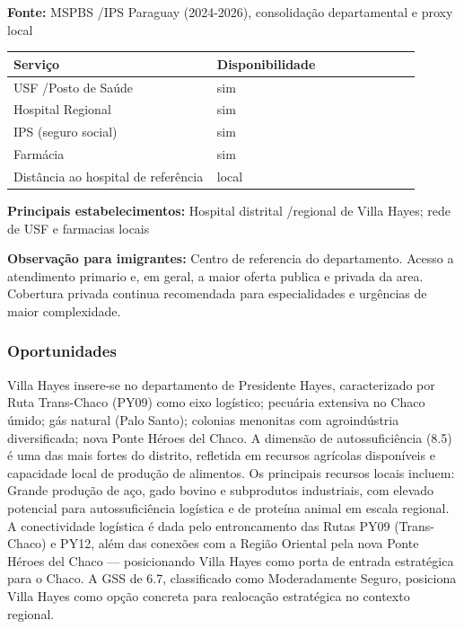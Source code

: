 \textbf{Fonte:} MSPBS /\allowbreak  IPS Paraguay (2024-2026), consolidação
departamental e proxy local

{\def\LTcaptype{none} %
\begin{longtable}{@{}>{\raggedright\arraybackslash}p{0.45\linewidth} >{\raggedright\arraybackslash}p{0.45\linewidth}@{}}
\toprule\noalign{}
Serviço & Disponibilidade \\
\midrule\noalign{}
\endhead
\bottomrule\noalign{}
\endlastfoot
USF /\allowbreak  Posto de Saúde & sim \\
Hospital Regional & sim \\
IPS (seguro social) & sim \\
Farmácia & sim \\
Distância ao hospital de referência & local \\
\end{longtable}
}

\textbf{Principais estabelecimentos:} Hospital distrital /\allowbreak  regional de
Villa Hayes; rede de USF e farmacias locais

\textbf{Observação para imigrantes:} Centro de referencia do
departamento. Acesso a atendimento primario e, em geral, a maior oferta
publica e privada da area. Cobertura privada continua recomendada para
especialidades e urgências de maior complexidade.

\subsubsection*{Oportunidades}\label{oport-villa-hayes-1504}
Villa Hayes insere-se no departamento de Presidente Hayes, caracterizado por Ruta Trans-Chaco (PY09) como eixo logístico; pecuária extensiva no Chaco úmido; gás natural (Palo Santo); colonias menonitas com agroindústria diversificada; nova Ponte Héroes del Chaco. A dimensão de autossuficiência (8.5) é uma das mais fortes do distrito, refletida em recursos agrícolas disponíveis e capacidade local de produção de alimentos. Os principais recursos locais incluem: Grande produção de aço, gado bovino e subprodutos industriais, com elevado potencial para autossuficiência logística e de proteína animal em escala regional. A conectividade logística é dada pelo entroncamento das Rutas PY09 (Trans-Chaco) e PY12, além das conexões com a Região Oriental pela nova Ponte Héroes del Chaco — posicionando Villa Hayes como porta de entrada estratégica para o Chaco. A GSS de 6.7, classificado como Moderadamente Seguro, posiciona Villa Hayes como opção concreta para realocação estratégica no contexto regional.

